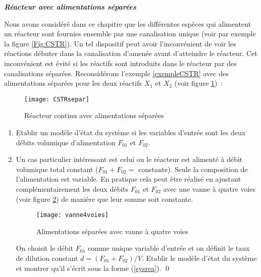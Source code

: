 \begin{exercice}{\bf \em Réacteur avec alimentations séparées}

Nous avons considéré dans ce chapitre que les différentes espèces qui alimentent un
réacteur sont fournies ensemble par une canalisation unique (voir par exemple la
figure \ref{Fig:CSTR}). Un tel dispositif peut avoir l'inconvénient de voir les
réactions débuter dans la canalisation d'amenée avant d'atteindre le réacteur. Cet
inconvénient est évité si les réactifs sont introduits dans le réacteur par des
canalisations séparées. Reconsidérons l'exemple \ref{exempleCSTR} avec des alimentations séparées pour
les deux réactifs $X_1$ et $X_2$ (voir figure \ref{Fig:CSTRsepar})~:
\begin{figure}[htbp] 
  \centering
   \texttt{[image: CSTRsepar]} 
   \caption{Réacteur continu avec alimentations séparées}
   \label{Fig:CSTRsepar}
\end{figure}
\begin{enumerate}
\item Etablir un modèle d'état du système si les variables d'entrée sont les deux débits volumique d'alimentation $F_{01}$ et $F_{02}$.
\item Un cas particulier intéressant est celui ou le réacteur
est alimenté à débit volumique total constant ($F_{01} + F_{02} =$ constante).
Seule la composition de l'alimentation est variable. En pratique cela peut être
réalisé en ajustant complémentairement les deux débits $F_{01}$ et $F_{02}$
avec une vanne à quatre voies (voir figure \ref{Fig:vanne4voies}) de manière
que leur somme soit constante.  
\begin{figure}[htbp] 
   \centering
   \texttt{[image: vanne4voies]} 
   \caption{Alimentations séparées avec vanne à quatre voies}
   \label{Fig:vanne4voies}
\end{figure}
On choisit le débit $F_{01}$
comme unique variable d'entrée et on définit le taux de dilution constant $d =
(F_{01} + F_{02})/V$. Etablir le modèle d'état du système et montrer qu'il s'écrit sous la forme (\ref{sysrea}). \qed
\end{enumerate}
\end{exercice}
\vv

